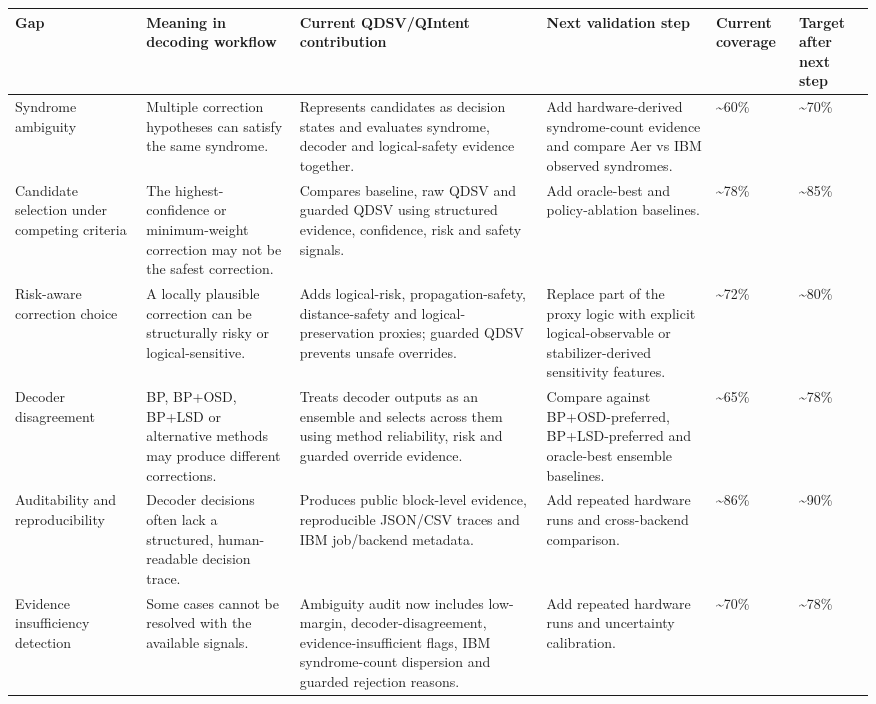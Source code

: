 \documentclass[11pt]{article}
\begin{document}
\begin{small}
\begin{longtable}{>{\raggedright\arraybackslash}p{}>{\raggedright\arraybackslash}p{}>{\raggedright\arraybackslash}p{}>{\raggedright\arraybackslash}p{}>{\raggedright\arraybackslash}p{}>{\raggedright\arraybackslash}p{}}
\toprule
Gap & Meaning in decoding workflow & Current QDSV/QIntent contribution & Next validation step & Current coverage & Target after next step \\
\midrule
Syndrome ambiguity & Multiple correction hypotheses can satisfy the same syndrome. & Represents candidates as decision states and evaluates syndrome, decoder and logical-safety evidence together. & Add hardware-derived syndrome-count evidence and compare Aer vs IBM observed syndromes. & \textasciitilde{}60\% & \textasciitilde{}70\% \\
Candidate selection under competing criteria & The highest-confidence or minimum-weight correction may not be the safest correction. & Compares baseline, raw QDSV and guarded QDSV using structured evidence, confidence, risk and safety signals. & Add oracle-best and policy-ablation baselines. & \textasciitilde{}78\% & \textasciitilde{}85\% \\
Risk-aware correction choice & A locally plausible correction can be structurally risky or logical-sensitive. & Adds logical-risk, propagation-safety, distance-safety and logical-preservation proxies; guarded QDSV prevents unsafe overrides. & Replace part of the proxy logic with explicit logical-observable or stabilizer-derived sensitivity features. & \textasciitilde{}72\% & \textasciitilde{}80\% \\
Decoder disagreement & BP, BP+OSD, BP+LSD or alternative methods may produce different corrections. & Treats decoder outputs as an ensemble and selects across them using method reliability, risk and guarded override evidence. & Compare against BP+OSD-preferred, BP+LSD-preferred and oracle-best ensemble baselines. & \textasciitilde{}65\% & \textasciitilde{}78\% \\
Auditability and reproducibility & Decoder decisions often lack a structured, human-readable decision trace. & Produces public block-level evidence, reproducible JSON/CSV traces and IBM job/backend metadata. & Add repeated hardware runs and cross-backend comparison. & \textasciitilde{}86\% & \textasciitilde{}90\% \\
Evidence insufficiency detection & Some cases cannot be resolved with the available signals. & Ambiguity audit now includes low-margin, decoder-disagreement, evidence-insufficient flags, IBM syndrome-count dispersion and guarded rejection reasons. & Add repeated hardware runs and uncertainty calibration. & \textasciitilde{}70\% & \textasciitilde{}78\% \\

\end{longtable}
\end{small}
\end{document}
